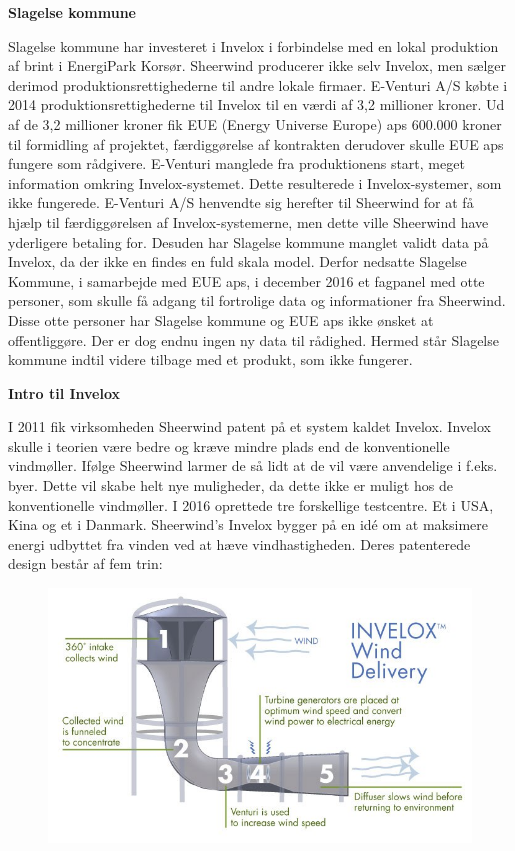 \textbf{Slagelse kommune}

Slagelse kommune har investeret i Invelox i forbindelse med en lokal produktion af brint i EnergiPark Korsør. Sheerwind producerer ikke selv Invelox, men sælger derimod produktionsrettighederne til andre lokale firmaer. E-Venturi A/S købte i 2014 produktionsrettighederne til Invelox til en værdi af 3,2 millioner kroner. Ud af de 3,2 millioner kroner fik EUE (Energy Universe Europe) aps 600.000 kroner til formidling af projektet, færdiggørelse af kontrakten derudover skulle EUE aps fungere som rådgivere.
E-Venturi manglede fra produktionens start, meget information omkring Invelox-systemet. Dette resulterede i Invelox-systemer, som ikke fungerede. E-Venturi A/S henvendte sig herefter til Sheerwind for at få hjælp til færdiggørelsen af Invelox-systemerne, men dette ville Sheerwind have yderligere betaling for.
Desuden har Slagelse kommune manglet validt data på Invelox, da der ikke en findes en fuld skala model. Derfor nedsatte Slagelse Kommune, i samarbejde med EUE aps, i december 2016 et fagpanel med otte personer, som skulle få adgang til fortrolige data og informationer fra Sheerwind. Disse otte personer har Slagelse kommune og EUE aps ikke ønsket at offentliggøre. Der er dog endnu ingen ny data til rådighed. Hermed står Slagelse kommune indtil videre tilbage med et produkt, som ikke fungerer.

\textbf{Intro til Invelox}

I 2011 fik virksomheden Sheerwind patent på et system kaldet Invelox. Invelox skulle i teorien være bedre og kræve mindre plads end de konventionelle vindmøller. Ifølge Sheerwind larmer de så lidt at de vil være anvendelige i f.eks. byer. Dette vil skabe helt nye muligheder, da dette ikke er muligt hos de konventionelle vindmøller. I 2016 oprettede tre forskellige testcentre. Et i USA, Kina og et i Danmark. 
Sheerwind’s Invelox bygger på en idé om at maksimere energi udbyttet fra vinden ved at hæve vindhastigheden. Deres patenterede design består af fem trin:

\begin{figure}[H]
\includegraphics[scale=0.85]{Billeder/invelox_design}
\end{figure}

